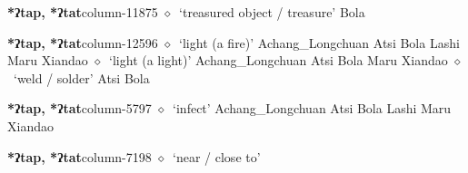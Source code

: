   \item {\footnotesize \textbf{*ʔtap, *ʔtat}}{\tiny column-11875}
         $\diamond$~`treasured object / treasure'
         Bola 
  \item {\footnotesize \textbf{*ʔtap, *ʔtat}}{\tiny column-12596}
         $\diamond$~`light (a fire)'
         Achang\_Longchuan 
\hspace{1ex}
         Atsi 
\hspace{1ex}
         Bola 
\hspace{1ex}
         Lashi 
\hspace{1ex}
         Maru 
\hspace{1ex}
         Xiandao 
\hspace{1ex}
         $\diamond$~`light (a light)'
         Achang\_Longchuan 
\hspace{1ex}
         Atsi 
\hspace{1ex}
         Bola 
\hspace{1ex}
         Maru 
\hspace{1ex}
         Xiandao 
\hspace{1ex}
         $\diamond$~`weld / solder'
         Atsi 
\hspace{1ex}
         Bola 
  \item {\footnotesize \textbf{*ʔtap, *ʔtat}}{\tiny column-5797}
         $\diamond$~`infect'
         Achang\_Longchuan 
\hspace{1ex}
         Atsi 
\hspace{1ex}
         Bola 
\hspace{1ex}
         Lashi 
\hspace{1ex}
         Maru 
\hspace{1ex}
         Xiandao 
  \item {\footnotesize \textbf{*ʔtap, *ʔtat}}{\tiny column-7198}
         $\diamond$~`near / close to'
